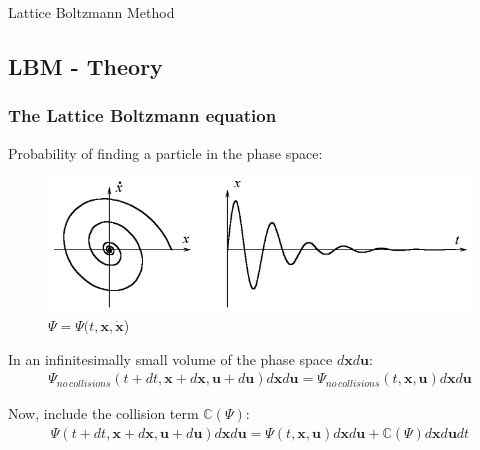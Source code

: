 \documentclass[10pt,handout]{beamer}
\begin{document}
\begin{frame}[standout]
    Lattice Boltzmann Method
\end{frame}

\subsection{LBM - Theory}
\begin{frame}\frametitle{The Lattice Boltzmann equation}
Probability of finding a particle in the phase space:
\begin{figure}
  \begin{minipage}[c]{0.6\textwidth}
    \includegraphics[width=\textwidth]{obrazki/PhaseSpace.png} 
  \end{minipage}\hfill
  \begin{minipage}[c]{0.4\textwidth} %
    \caption{$\Psi = \Psi(t, \textbf{x}, \dot{\textbf{x}}$)} \label{fig:PhaseSpace}
  \end{minipage}
\end{figure}

\pause
In an infinitesimally small volume of the phase space $d\textbf{x} d\textbf{u} $:
\begin{eqnarray} 
	 \Psi_{no\,collisions}(t +dt, \textbf{x} + d\textbf{x}, \textbf{u} + d\textbf{u}) d\textbf{x} d\textbf{u} =
	 \Psi_{no\,collisions}(t, \textbf{x}, \textbf{u}) d\textbf{x} d\textbf{u}\nonumber
\end{eqnarray}

\pause
Now, include the collision term  $\mathbb{C}(\Psi)$:
\begin{eqnarray} \label{distributionFunctionEvolution}
	 \Psi(t +dt, \textbf{x} + d\textbf{x}, \textbf{u} + d\textbf{u})  d\textbf{x} d\textbf{u}=
	 \Psi(t, \textbf{x}, \textbf{u}) d\textbf{x} d\textbf{u} + \mathbb{C}(\Psi)  d\textbf{x} d\textbf{u} dt  \nonumber
\end{eqnarray} 
\end{frame} 
\end{document}
